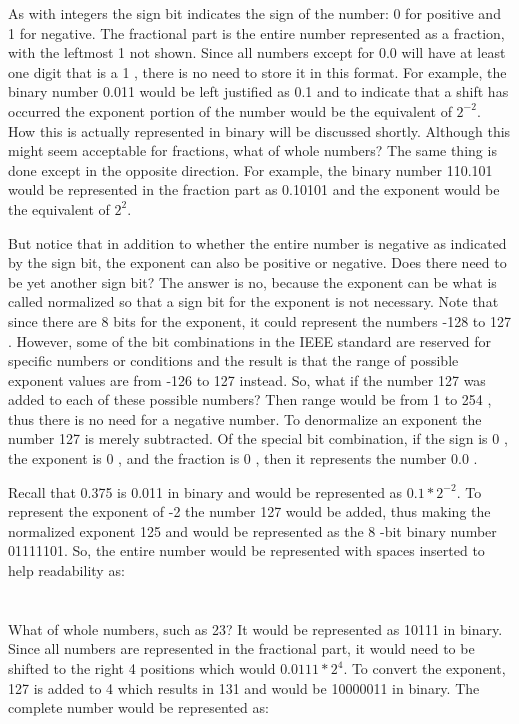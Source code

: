 \documentclass[10pt]{book}
\begin{document}
As with integers the sign bit indicates the sign of the number: 0 for positive and 1 for negative. The fractional part is the entire number represented as a fraction, with the leftmost 1 not shown. Since all numbers except for 0.0 will have at least one digit that is a 1 , there is no need to store it in this format. For example, the binary number 0.011 would be left justified as 0.1 and to indicate that a shift has occurred the exponent portion of the number would be the equivalent of $2^{-2}$. How this is actually represented in binary will be discussed shortly. Although this might seem acceptable for fractions, what of whole numbers? The same thing is done except in the opposite direction. For example, the binary number 110.101 would be represented in the fraction part as 0.10101 and the exponent would be the equivalent of $2^{2}$.

But notice that in addition to whether the entire number is negative as indicated by the sign bit, the exponent can also be positive or negative. Does there need to be yet another sign bit? The answer is no, because the exponent can be what is called normalized so that a sign bit for the exponent is not necessary. Note that since there are 8 bits for the exponent, it could represent the numbers -128 to 127 . However, some of the bit combinations in the IEEE standard are reserved for specific numbers or conditions and the result is that the range of possible exponent values are from -126 to 127 instead. So, what if the number 127 was added to each of these possible numbers? Then range would be from 1 to 254 , thus there is no need for a negative number. To denormalize an exponent the number 127 is merely subtracted. Of the special bit combination, if the sign is 0 , the exponent is 0 , and the fraction is 0 , then it represents the number 0.0 .

Recall that 0.375 is 0.011 in binary and would be represented as $0.1 * 2^{-2}$. To represent the exponent of -2 the number 127 would be added, thus making the normalized exponent 125 and would be represented as the 8 -bit binary number 01111101. So, the entire number would be represented with spaces inserted to help readability as:

\section{}
What of whole numbers, such as 23? It would be represented as 10111 in binary. Since all numbers are represented in the fractional part, it would need to be shifted to the right 4 positions which would $0.0111 * 2^{4}$. To convert the exponent, 127 is added to 4 which results in 131 and would be 10000011 in binary. The complete number would be represented as:
\end{document}
